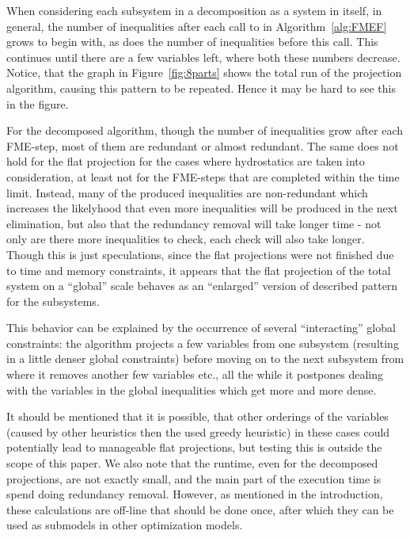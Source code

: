 When considering each subsystem in a decomposition as a system in itself, in general, the number of inequalities after each call to  in Algorithm~\ref{alg:FMEF} grows to begin with, as does the number of inequalities before this call. This continues until there are a few variables left, where both these numbers decrease. Notice, that the graph in Figure~\ref{fig:8parts} shows the total run of the projection algorithm, causing this pattern to be repeated. Hence it may be hard to see this in the figure.

For the decomposed algorithm, though the number of inequalities grow after each FME-step, most of them are redundant or almost redundant. The same does not hold for the flat projection for the cases where hydrostatics are taken into consideration, at least not for the FME-steps that are completed within the time limit. Instead, many of the produced inequalities are non-redundant which increases the likelyhood that even more inequalities will be produced in the next elimination, but also that the redundancy removal will take longer time - not only are there more inequalities to check, each check will also take longer. 
{Though this is just speculations, since the flat projections were not finished due to time and memory constraints, it appears that the flat projection of the total system on a ``global'' scale behaves as an ``enlarged'' version of described pattern for the subsystems.}

{This behavior can be explained by the occurrence of several ``interacting'' global constraints: the algorithm projects a few variables from one subsystem (resulting in a little denser global constraints) before moving on to the next subsystem from where it removes another few variables etc., all the while it postpones dealing with the variables in the global inequalities which get more and more dense.}

It should be mentioned that it is possible, that other orderings of the variables (caused by other heuristics then the used greedy heuristic) in these cases could potentially lead to manageable flat projections, but testing this is outside the scope of this paper.  
We also note that the runtime, even for the decomposed projections, are not exactly small, and the main part of the execution time is spend doing redundancy removal. However, as mentioned in the introduction, these calculations are off-line that should be done once, after which they can be used as submodels in other optimization models.  

